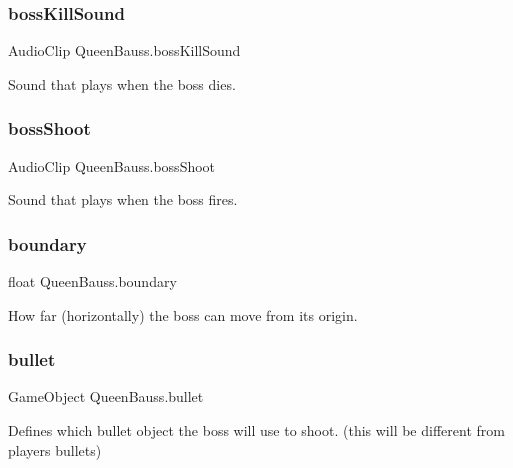\subsubsection{\texorpdfstring{bossKillSound}{bossKillSound}}
{\footnotesize\ttfamily Audio\+Clip Queen\+Bauss.\+boss\+Kill\+Sound}



Sound that plays when the boss dies. 

\mbox{\label{class_queen_bauss_a9cff9aa86adc0ceccbd311bd007f5b5c}} 
\subsubsection{\texorpdfstring{bossShoot}{bossShoot}}
{\footnotesize\ttfamily Audio\+Clip Queen\+Bauss.\+boss\+Shoot}



Sound that plays when the boss fires. 

\mbox{\label{class_queen_bauss_a738d137bcf9a273c67a1b122c6f28822}} 
\subsubsection{\texorpdfstring{boundary}{boundary}}
{\footnotesize\ttfamily float Queen\+Bauss.\+boundary}



How far (horizontally) the boss can move from its origin. 

\mbox{\label{class_queen_bauss_a3b035e20519b15a46b1cfa28a3300d1a}} 
\subsubsection{\texorpdfstring{bullet}{bullet}}
{\footnotesize\ttfamily Game\+Object Queen\+Bauss.\+bullet}



Defines which bullet object the boss will use to shoot. (this will be different from player\textquotesingle{}s bullets) 

\mbox{\label{class_queen_bauss_a5c17fa20ec6761760b7651176a1c1e7e}} 
